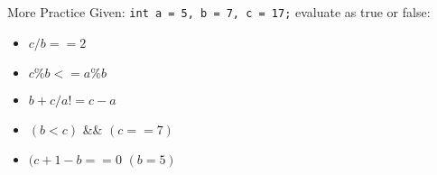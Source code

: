 \documentclass[graphics]{beamer}
\begin{document}
\begin{frame}{More Practice}
    Given: \texttt{int a = 5, b = 7, c = 17;} evaluate as true or false:
    \begin{itemize}
        \item $c / b == 2$ \only<2->{\underline{true}}
        \item $c \% b <= a \% b$ 
        \item $b + c / a != c - a$ 
        \item $(b<c)$ \&\& $(c == 7)$ 
        \item $(c + 1 - b == 0$ \textbar\textbar $(b = 5)$ 
    \end{itemize}
\end{frame}
\end{document}
